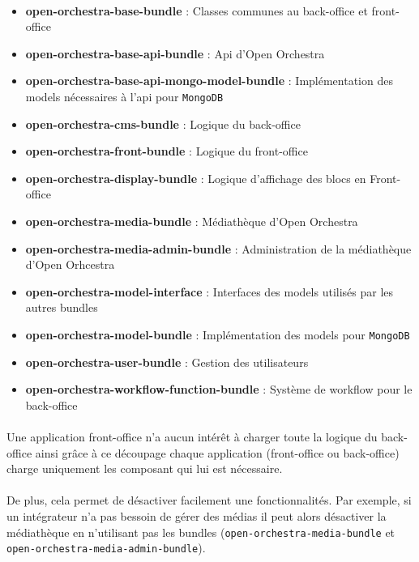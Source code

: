    \paragraph{}
   \begin{itemize}
   \item \textbf{open-orchestra-base-bundle} : Classes communes au back-office et front-office
   \item \textbf{open-orchestra-base-api-bundle} : Api d'Open Orchestra
   \item \textbf{open-orchestra-base-api-mongo-model-bundle} : Implémentation des models nécessaires à l'api pour \verb?MongoDB? 
   \item \textbf{open-orchestra-cms-bundle} : Logique du back-office
   \item \textbf{open-orchestra-front-bundle} : Logique du front-office
   \item \textbf{open-orchestra-display-bundle} : Logique d'affichage des blocs en Front-office
   \item \textbf{open-orchestra-media-bundle} : Médiathèque d'Open Orchestra
   \item \textbf{open-orchestra-media-admin-bundle} : Administration de la médiathèque d'Open Orhcestra
   \item \textbf{open-orchestra-model-interface} : Interfaces des models utilisés par les autres bundles 
   \item \textbf{open-orchestra-model-bundle} : Implémentation des models pour \verb?MongoDB? 
   \item \textbf{open-orchestra-user-bundle} : Gestion des utilisateurs 
   \item \textbf{open-orchestra-workflow-function-bundle} : Système de workflow pour le back-office 
   \end{itemize}
   \paragraph{}
    Une application front-office n'a aucun intérêt à charger toute la logique du back-office ainsi grâce à ce découpage chaque application (front-office ou back-office) charge uniquement les composant qui lui est nécessaire.
   \paragraph{}
   De plus, cela permet de désactiver facilement une fonctionnalités. Par exemple, si un intégrateur n'a pas bessoin de gérer des médias il peut alors désactiver la médiathèque en n'utilisant pas les bundles (\verb?open-orchestra-media-bundle? et \verb?open-orchestra-media-admin-bundle?).


